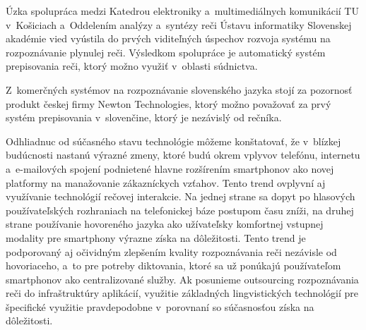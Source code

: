 Úzka spolupráca medzi Katedrou elektroniky a~multimediálnych komunikácií TU v~Košiciach a~Oddelením analýzy a~syntézy reči Ústavu informatiky Slovenskej akadémie vied vyústila do prvých viditeľných úspechov rozvoja systému na rozpoznávanie plynulej reči. Výsledkom spolupráce je automatický systém prepisovania reči, ktorý možno využiť v~oblasti súdnictva.

Z~komerčných systémov na rozpoznávanie slovenského jazyka stojí za pozornosť produkt českej firmy Newton Technologies, ktorý možno považovať za prvý systém prepisovania v~slovenčine, ktorý je nezávislý od rečníka.

Odhliadnuc od súčasného stavu technológie môžeme konštatovať, že v~blízkej budúcnosti nastanú výrazné zmeny, ktoré budú okrem vplyvov telefónu, internetu a~e-mailových spojení podnietené hlavne rozšírením smartphonov ako novej platformy na manažovanie zákazníckych vzťahov. Tento trend ovplyvní aj využívanie technológií rečovej interakcie. Na jednej strane sa dopyt po hlasových používateľských rozhraniach na telefonickej báze postupom času zníži, na druhej strane používanie hovoreného jazyka ako užívateľsky komfortnej vstupnej modality pre smartphony výrazne získa na dôležitosti. Tento trend je podporovaný aj očividným zlepšením kvality rozpoznávania reči nezávisle od hovoriaceho, a~to pre potreby diktovania, ktoré sa už ponúkajú používateľom smartphonov ako centralizované služby. Ak posunieme outsourcing rozpoznávania reči do infraštruktúry aplikácií, využitie základných lingvistických technológií pre špecifické využitie pravdepodobne v~porovnaní so súčasnosťou získa na dôležitosti.  
